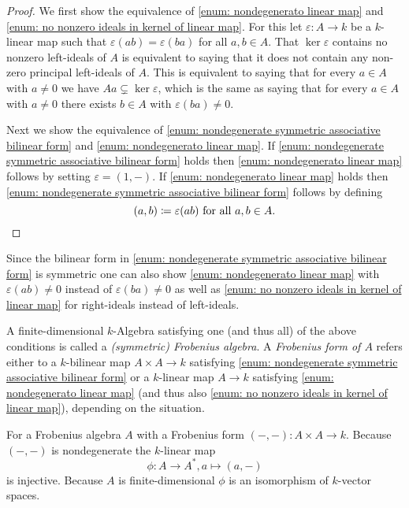 \begin{proof}
 We first show the equivalence of \ref{enum: nondegenerato linear map} and \ref{enum: no nonzero ideals in kernel of linear map}. For this let $\varepsilon \colon A \to k$ be a $k$-linear map such that $\varepsilon(ab) = \varepsilon(ba)$ for all $a,b \in A$. That $\ker \varepsilon$ contains no nonzero left-ideals of $A$ is equivalent to saying that it does not contain any non-zero principal left-ideals of $A$. This is equivalent to saying that for every $a \in A$ with $a \neq 0$ we have $Aa \subsetneq \ker \varepsilon$, which is the same as saying that for every $a \in A$ with $a \neq 0$ there exists $b \in A$ with $\varepsilon(ba) \neq 0$.
 
 Next we show the equivalence of \ref{enum: nondegenerate symmetric associative bilinear form} and \ref{enum: nondegenerato linear map}. If \ref{enum: nondegenerate symmetric associative bilinear form} holds then \ref{enum: nondegenerato linear map} follows by setting $\varepsilon = (1,-)$. If \ref{enum: nondegenerato linear map} holds then \ref{enum: nondegenerate symmetric associative bilinear form} follows by defining
 \[
  (a,b) \coloneqq \varepsilon(ab) \text{ for all } a,b \in A.
  \qedhere
 \]
\end{proof}


\begin{rem}
 Since the bilinear form in \ref{enum: nondegenerate symmetric associative bilinear form} is symmetric one can also show \ref{enum: nondegenerato linear map} with $\varepsilon(ab) \neq 0$ instead of $\varepsilon(ba) \neq 0$ as well as \ref{enum: no nonzero ideals in kernel of linear map} for right-ideals instead of left-ideals.
\end{rem}


\begin{defi}
 A finite-dimensional $k$-Algebra satisfying one (and thus all) of the above conditions is called a \emph{(symmetric) Frobenius algebra}. A \emph{Frobenius form of $A$} refers either to a $k$-bilinear map $A \times A \to k$ satisfying \ref{enum: nondegenerate symmetric associative bilinear form} or a $k$-linear map $A \to k$ satisfying \ref{enum: nondegenerato linear map} (and thus also \ref{enum: no nonzero ideals in kernel of linear map}), depending on the situation.
\end{defi}


\begin{rem}
 For a Frobenius algebra $A$ with a Frobenius form $(-,-) \colon A \times A \to k$. Because $(-,-)$ is nondegenerate the $k$-linear map
 \[
  \phi \colon A \to A^*, a \mapsto (a,-)
 \]
 is injective. Because $A$ is finite-dimensional $\phi$ is an isomorphism of $k$-vector spaces.
\end{rem}


